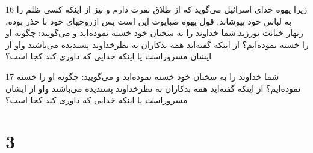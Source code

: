 \par 16 زیرا یهوه خدای اسرائیل می‌گوید که از طلاق نفرت دارم و نیز از اینکه کسی ظلم را به لباس خود بپوشاند. قول یهوه صبایوت این است پس ازروحهای خود با حذر بوده، زنهار خیانت نورزید.شما خداوند را به سخنان خود خسته نموده‌اید و می‌گویید: چگونه او را خسته نموده‌ایم؟ از اینکه گفته‌اید همه بدکاران به نظرخداوند پسندیده می‌باشند واو از ایشان مسروراست یا اینکه خدایی که داوری کند کجا است؟
\par 17 شما خداوند را به سخنان خود خسته نموده‌اید و می‌گویید: چگونه او را خسته نموده‌ایم؟ از اینکه گفته‌اید همه بدکاران به نظرخداوند پسندیده می‌باشند واو از ایشان مسروراست یا اینکه خدایی که داوری کند کجا است؟

\chapter{3}

